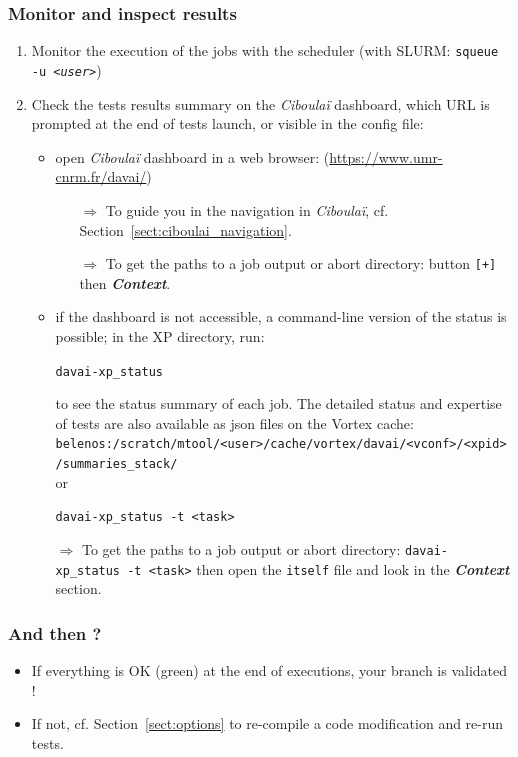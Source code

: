 \documentclass[a4paper,10pt,twoside]{article}
\begin{document}
\subsubsection{Monitor and inspect results}
\begin{enumerate}[resume,label=(\alph*)]
 \item Monitor the execution of the jobs with the scheduler (with SLURM: \texttt{squeue -u \textit{<user>}})
 \item Check the tests results summary on the \textit{Ciboulaï} dashboard, which URL is prompted at the end of tests launch, or visible in the config file:
 \begin{itemize}
  \item open \textit{Ciboulaï} dashboard in a web browser: (\href{https://www.umr-cnrm.fr/davai/}{https://www.umr-cnrm.fr/davai/})
  \begin{itemize}
   \item[$\Rightarrow$] To guide you in the navigation in \textit{Ciboulaï}, cf. Section~\ref{sect:ciboulai_navigation}.
   \item[$\Rightarrow$] To get the paths to a job output or abort directory: button \texttt{[+]} then \textit{\textbf{Context}}.
  \end{itemize}
  \item if the dashboard is not accessible, a command-line version of the status is possible; in the XP directory, run:
  
  \texttt{davai-xp\_status}
  
  to see the status summary of each job.
  The detailed status and expertise of tests are also available as json files on the Vortex cache:\\
 \texttt{belenos:/scratch/mtool/<user>/cache/vortex/davai/<vconf>/<xpid>/summaries\_stack/}\\
 or
 
 \texttt{davai-xp\_status -t <task>}
 
 $\Rightarrow$ To get the paths to a job output or abort directory: \texttt{davai-xp\_status -t <task>} then open the \texttt{itself} file and look in the \textit{\textbf{Context}} section.
 \end{itemize}
\end{enumerate}

\subsubsection*{And then ?}
\begin{itemize}
 \item If everything is OK (green) at the end of executions, your branch is validated !
 \item If not, cf. Section~\ref{sect:options} to re-compile a code modification and re-run tests.
\end{itemize}
\end{document}
